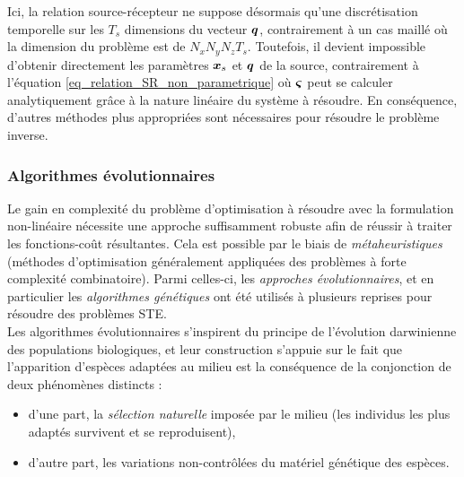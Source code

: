{Ici, la relation source-récepteur ne suppose désormais qu'une discrétisation temporelle sur les $T_s$ dimensions du vecteur ${\bm{q}}$, contrairement à un cas maillé où  la dimension du problème est de $N_xN_yN_zT_s$.} Toutefois, {il devient impossible d'obtenir directement les paramètres ${\bm{x}_s}$ et ${\bm{q}}$ de la source, contrairement à l'équation \eqref{eq_relation_SR_non_parametrique} où ${\bm{\varsigma}}$ peut se calculer analytiquement grâce à la nature linéaire du système à résoudre. En conséquence, d'autres méthodes plus appropriées sont nécessaires pour résoudre le problème inverse.} 

\subsubsection{Algorithmes évolutionnaires}

Le gain en complexité du problème d'optimisation à résoudre {avec} la formulation non-linéaire nécessite une approche suffisamment robuste afin de réussir à traiter les fonctions-coût résultantes. Cela est possible par le biais de \textit{métaheuristiques} (méthodes d'optimisation généralement appliquées des problèmes à forte complexité combinatoire). Parmi celles-ci, les \textit{approches évolutionnaires}, et en particulier les \textit{algorithmes génétiques} ont été utilisés à plusieurs reprises pour résoudre des problèmes STE.\\
Les algorithmes évolutionnaires s'inspirent du principe de l'évolution darwinienne des populations biologiques, et leur construction s'appuie sur le fait que l'apparition d'espèces adaptées au milieu est la conséquence de la conjonction de deux phénomènes distincts : 

 \begin{itemize}
 	\item d'une part, la \textit{sélection naturelle} imposée par le milieu (les individus les plus adaptés survivent et se reproduisent),
 	\item d'autre part, les variations non-contrôlées du matériel génétique des espèces.
 \end{itemize}
 
